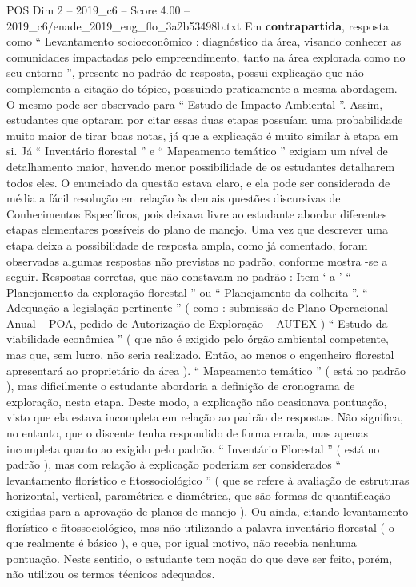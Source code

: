 \begin{textsample}{POS Dim 2 – 2019\_c6 – Score 4.00 – 2019\_c6/enade\_2019\_eng\_flo\_3a2b53498b.txt}
Em \textbf{contrapartida}, resposta como “ Levantamento socioeconômico : diagnóstico da área, visando conhecer as comunidades impactadas pelo empreendimento, tanto na área explorada como no seu entorno ”, presente no padrão de resposta, possui explicação que não complementa a citação do tópico, possuindo praticamente a mesma abordagem.
O mesmo pode ser observado para “ Estudo de Impacto Ambiental ”.
Assim, estudantes que optaram por citar essas duas etapas possuíam uma probabilidade muito maior de tirar boas notas, já que a explicação é muito similar à etapa em si.
Já “ Inventário florestal ” e “ Mapeamento temático ” exigiam um nível de detalhamento maior, havendo menor possibilidade de os estudantes detalharem todos eles.
O enunciado da questão estava claro, e ela pode ser considerada de média a fácil resolução em relação às demais questões discursivas de Conhecimentos Específicos, pois deixava livre ao estudante abordar diferentes etapas elementares possíveis do plano de manejo.
Uma vez que descrever uma etapa deixa a possibilidade de resposta ampla, como já comentado, foram observadas algumas respostas não previstas no padrão, conforme mostra -se a seguir.
Respostas corretas, que não constavam no padrão : Item ‘ a ’ “ Planejamento da exploração florestal ” ou “ Planejamento da colheita ”. “ Adequação a legislação pertinente ” ( como : submissão de Plano Operacional Anual – POA, pedido de Autorização de Exploração – AUTEX ) “ Estudo da viabilidade econômica ” ( que não é exigido pelo órgão ambiental competente, mas que, sem lucro, não seria realizado.
Então, ao menos o engenheiro florestal apresentará ao proprietário da área ). “ Mapeamento temático ” ( está no padrão ), mas dificilmente o estudante abordaria a definição de cronograma de exploração, nesta etapa.
Deste modo, a explicação não ocasionava pontuação, visto que ela estava incompleta em relação ao padrão de respostas.
Não significa, no entanto, que o discente tenha respondido de forma errada, mas apenas incompleta quanto ao exigido pelo padrão. “ Inventário Florestal ” ( está no padrão ), mas com relação à explicação poderiam ser considerados “ levantamento florístico e fitossociológico ” ( que se refere à avaliação de estruturas horizontal, vertical, paramétrica e diamétrica, que são formas de quantificação exigidas para a aprovação de planos de manejo ).
Ou ainda, citando levantamento florístico e fitossociológico, mas não utilizando a palavra inventário florestal ( o que realmente é básico ), e que, por igual motivo, não recebia nenhuma pontuação.
Neste sentido, o estudante tem noção do que deve ser feito, porém, não utilizou os termos técnicos adequados.

\end{textsample}
